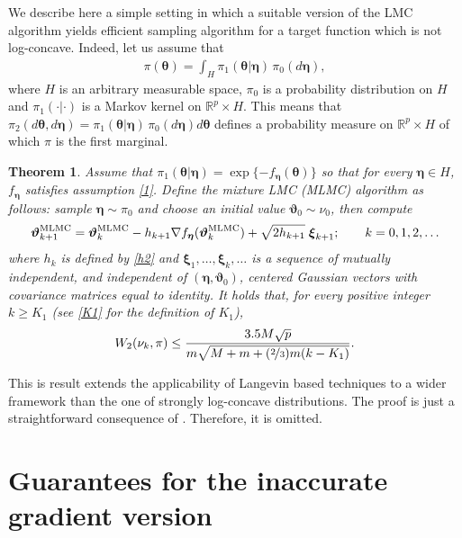 \documentclass[aoap,preprint,reqno,a4paper]{imsart} %
\newcommand{\RR}{\mathbb{R}}
\newcommand{\eeta}{\boldsymbol{\eta}}
\newcommand{\btheta}{\boldsymbol{\theta}}
\newcommand{\bvartheta}{\boldsymbol{\vartheta}}
\newcommand{\bxi}{\boldsymbol{\xi}}
\newtheorem{theorem}{Theorem}
\begin{document}
We describe here a simple setting in which a suitable version of the LMC algorithm
yields efficient sampling algorithm for a target function which is not log-concave.
Indeed, let us assume that
\begin{align}\label{mixture}
\pi(\btheta) = \int_{H} \pi_1(\btheta|\eeta)\,\pi_0(d\eeta),
\end{align}
where $H$ is an arbitrary measurable space, $\pi_0$ is a probability distribution
on $H$ and $\pi_1(\cdot|\cdot)$ is a Markov kernel on $\RR^p\times H$. This means
that $\pi_2(d\btheta,d\eeta) = \pi_1(\btheta|\eeta)\,\pi_0(d\eeta)d\btheta$ defines
a probability measure on $\RR^p\times H$ of which $\pi$ is the first marginal.


\begin{theorem}
Assume that $\pi_1(\btheta|\eeta) = \exp\{-f_{\eeta}(\btheta)\}$ so that
for every $\eeta\in H$, $f_{\eeta}$ satisfies assumption \eqref{1}.
Define the mixture LMC (MLMC) algorithm as follows: sample $\eeta\sim \pi_0$ and choose an initial value $\bvartheta_0\sim \nu_0$, then compute
\begin{align}\label{LMC3}
\bvartheta_{k+1}^{\rm MLMC} = \bvartheta^{\rm MLMC}_{k} - h_{k+1} \nabla
f_{\eeta}(\bvartheta_{k}^{\rm MLMC})+ \sqrt{2h_{k+1}}\;\bxi_{k+1};
\qquad k=0,1,2,\ldots
\end{align}
where $h_k$ is defined by \eqref{h2} and $\bxi_1,\ldots,\bxi_{k},\ldots$ is a sequence
of mutually independent, and independent of $(\eeta,\bvartheta_{0})$,
centered Gaussian vectors with covariance matrices equal to identity. It holds that,
for every positive integer $k\ge K_1$ (see \cref{K1} for the definition of $K_1$),
\begin{equation}
W_2(\nu_k,\pi)\le \frac{3.5M\sqrt{p}}{m\sqrt{M+m+(\nicefrac23)m(k-K_1)}}.
\end{equation}
\end{theorem}
This is result extends the applicability of Langevin based techniques
to a wider framework than the one of strongly log-concave distributions.
The proof is just a straightforward consequence of . Therefore,
it is omitted.


\section{Guarantees for the inaccurate gradient version}
\label{sec:4}
\end{document}
